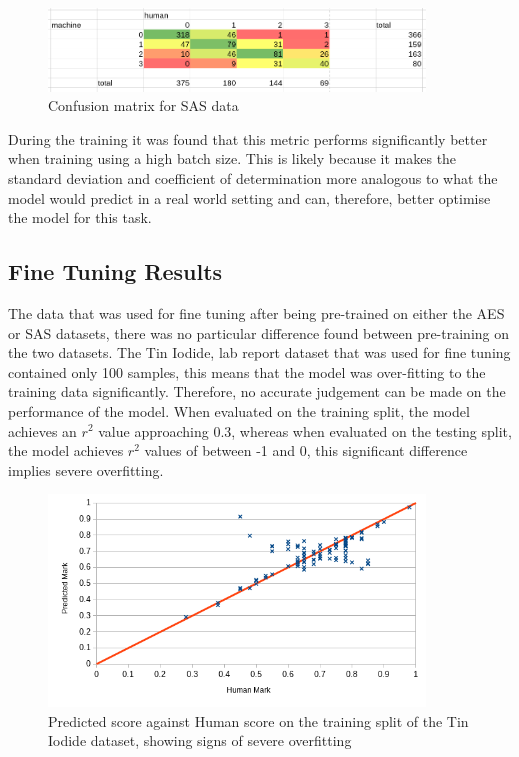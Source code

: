 \documentclass[11pt]{article}
\begin{document}
\begin{figure}[htbp]
\centering
\includegraphics[width=10cm]{./exp5_sas_confusion.png}
\caption{Confusion matrix for SAS data}
\end{figure}

During the training it was found that this metric performs significantly better when training using a high batch size. This is likely because it makes the standard deviation and coefficient of determination more analogous to what the model would predict in a real world setting and can, therefore, better optimise the model for this task.

\subsection{Fine Tuning Results}
\label{sec:orgfd50efa}
The data that was used for fine tuning after being pre-trained on either the AES or SAS datasets, there was no particular difference found between pre-training on the two datasets. The Tin Iodide, lab report dataset that was used for fine tuning contained only 100 samples, this means that the model was over-fitting to the training data significantly. Therefore, no accurate judgement can be made on the performance of the model. When evaluated on the training split, the model achieves an \(r^2\) value approaching 0.3, whereas when evaluated on the testing split, the model achieves \(r^2\) values of between -1 and 0, this significant difference implies severe overfitting.

\begin{figure}[htbp]
\centering
\includegraphics[width=10cm]{./exp5_fine_dist_train.png}
\caption{Predicted score against Human score on the training split of the Tin Iodide dataset, showing signs of severe overfitting \label{fig:overfit}}
\end{figure}
\end{document}
